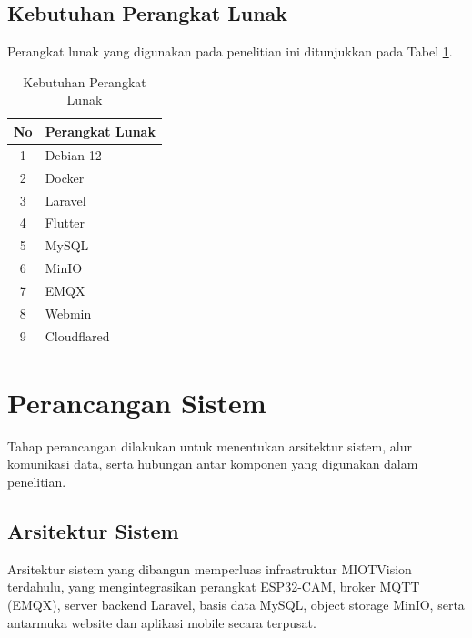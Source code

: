 \subsection{Kebutuhan Perangkat Lunak}

Perangkat lunak yang digunakan pada penelitian ini ditunjukkan pada Tabel \ref{tab:software}.

\begin{table}[H]
	\centering
	\caption{Kebutuhan Perangkat Lunak}
	\label{tab:software}
	\begin{tabular}{|c|l|}
		\hline
		No & Perangkat Lunak \\
		\hline
		1 & Debian 12 \\
		2 & Docker \\
		3 & Laravel \\
		4 & Flutter \\
		5 & MySQL \\
		6 & MinIO \\
		7 & EMQX \\
		8 & Webmin \\
		9 & Cloudflared \\
		\hline
	\end{tabular}
\end{table}

\section{Perancangan Sistem}

Tahap perancangan dilakukan untuk menentukan arsitektur sistem, alur komunikasi data, serta hubungan antar komponen yang digunakan dalam penelitian.

\subsection{Arsitektur Sistem}

Arsitektur sistem yang dibangun memperluas infrastruktur MIOTVision terdahulu, yang mengintegrasikan perangkat ESP32-CAM, broker MQTT (EMQX), server backend Laravel, basis data MySQL, object storage MinIO, serta antarmuka website dan aplikasi mobile secara terpusat.


